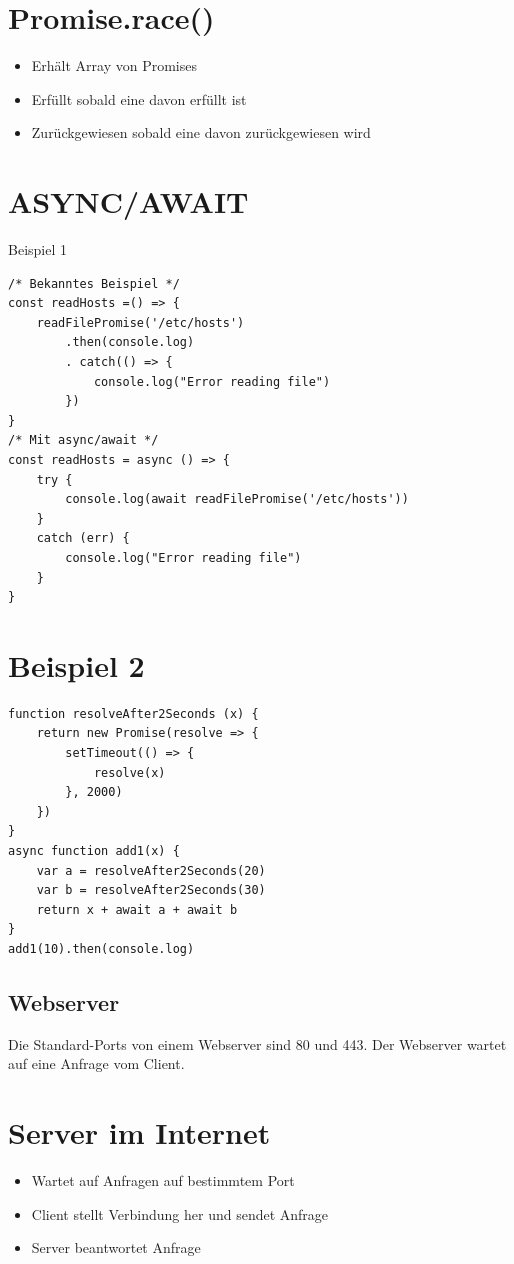 \section*{Promise.race()}
\begin{itemize}
  \item Erhält Array von Promises
  \item Erfüllt sobald eine davon erfüllt ist
  \item Zurückgewiesen sobald eine davon zurückgewiesen wird
\end{itemize}

\section*{ASYNC/AWAIT}
Beispiel 1

\begin{verbatim}
/* Bekanntes Beispiel */
const readHosts =() => {
    readFilePromise('/etc/hosts')
        .then(console.log)
        . catch(() => {
            console.log("Error reading file")
        })
}
/* Mit async/await */
const readHosts = async () => {
    try {
        console.log(await readFilePromise('/etc/hosts'))
    }
    catch (err) {
        console.log("Error reading file")
    }
}
\end{verbatim}

\section*{Beispiel 2}
\begin{verbatim}
function resolveAfter2Seconds (x) {
    return new Promise(resolve => {
        setTimeout(() => {
            resolve(x)
        }, 2000)
    })
}
async function add1(x) {
    var a = resolveAfter2Seconds(20)
    var b = resolveAfter2Seconds(30)
    return x + await a + await b
}
add1(10).then(console.log)
\end{verbatim}

\subsection{Webserver}
Die Standard-Ports von einem Webserver sind 80 und 443. Der Webserver wartet auf eine Anfrage vom Client.

\section*{Server im Internet}
\begin{itemize}
  \item Wartet auf Anfragen auf bestimmtem Port
  \item Client stellt Verbindung her und sendet Anfrage
  \item Server beantwortet Anfrage
\end{itemize}

